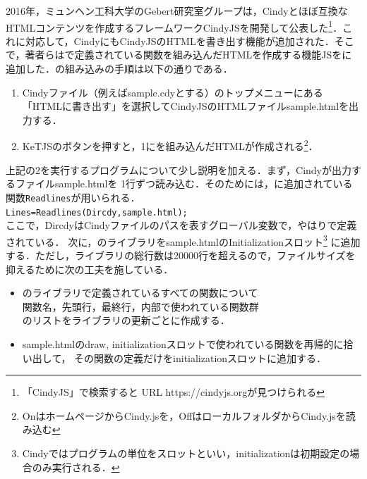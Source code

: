 \documentclass[a4j,12pt]{ujarticle}
\newcounter{Li}
\begin{document}
2016年，ミュンヘン工科大学のGebert研究室グループは，Cindyとほぼ互換なHTMLコンテンツを作成するフレームワークCindyJSを開発して公表した\footnote{「CindyJS」で検索すると URL https://cindyjs.orgが見つけられる}．これに対応して，CindyにもCindyJSのHTMLを書き出す機能が追加された．そこで，著者らは\ketcindy で定義されている関数を組み込んだHTMLを作成する機能\ketcindy JSを\ketcindy に追加した．\ketcindy の組み込みの手順は以下の通りである．\vspace{-2mm}

\begin{enumerate}
\item Cindyファイル（例えばsample.cdyとする）のトップメニューにある「HTMLに書き出す」を選択してCindyJSのHTMLファイルsample.htmlを出力する．\vspace{-2mm}
\item KeTJSのボタンを押すと，1に\ketcindy を組み込んだHTMLが作成される\footnote{OnはホームページからCindy.jsを，OffはローカルフォルダからCindy.jsを読み込む}．\vspace{-1mm}
\end{enumerate}

上記の2を実行するプログラムについて少し説明を加える．まず，Cindyが出力するファイルsample.htmlを
1行ずつ読み込む．そのためには，\ketcindy に追加されている関数\verb|Readlines|が用いられる．\\
\hspace*{2zw}\verb|Lines=Readlines(Dircdy,sample.html);|\\
ここで，DircdyはCindyファイルのパスを表すグローバル変数で，やはり\ketcindy で定義されている．
次に，\ketcindy のライブラリをsample.htmlのInitializationスロット\footnote{Cindyではプログラムの単位をスロットといい，initializationは初期設定の場合のみ実行される．}
に追加する．ただし，ライブラリの総行数は20000行を超えるので，ファイルサイズを抑えるために次の工夫を施している．\vspace{-1mm}
\begin{itemize}
\item  \ketcindy のライブラリで定義されているすべての関数について\\
\hspace*{2zw}関数名，先頭行，最終行，内部で使われている\ketcindy 関数群\\
のリストをライブラリの更新ごとに作成する．\vspace{-2mm}
\item sample.htmlのdraw, initializationスロットで使われている関数を再帰的に拾い出して，
その関数の定義だけをinitializationスロットに追加する．\vspace{-1mm}
\end{itemize}
\end{document}
